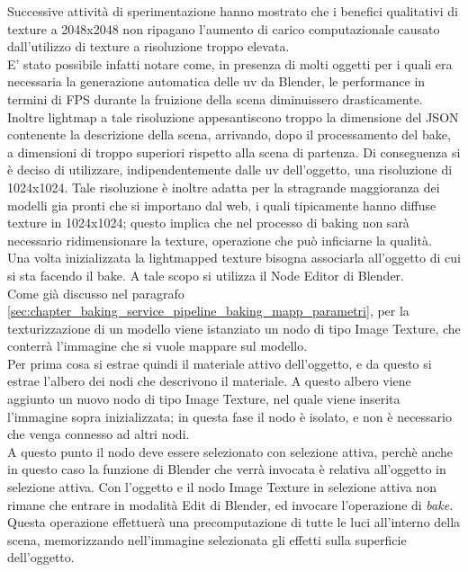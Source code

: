 Successive attività di sperimentazione hanno mostrato che i benefici qualitativi di texture a 2048x2048  non ripagano l’aumento di carico computazionale causato dall’utilizzo di texture a risoluzione troppo elevata.
\\ 
E’ stato possibile infatti notare come, in presenza di molti oggetti per i quali era necessaria la generazione automatica delle uv da Blender, le performance in termini di FPS durante la fruizione della scena diminuissero drasticamente. 
\\
Inoltre lightmap a tale risoluzione appesantiscono troppo la dimensione del JSON contenente la descrizione della scena, arrivando, dopo il processamento del bake, a dimensioni di troppo superiori rispetto alla scena di partenza. Di conseguenza si è deciso di utilizzare, indipendentemente dalle uv dell’oggetto, una risoluzione di 1024x1024. Tale risoluzione è inoltre adatta per la stragrande maggioranza dei modelli gia pronti che si importano dal web, i quali tipicamente hanno diffuse texture in 1024x1024; questo implica che nel processo di baking non sarà necessario ridimensionare la texture, operazione che può inficiarne la qualità. 
\\
Una volta inizializzata la lightmapped texture bisogna associarla all’oggetto di cui si sta facendo il bake.
A tale scopo si utilizza il Node Editor di Blender. 
\\
Come già discusso nel paragrafo \ref{sec:chapter_baking_service_pipeline_baking_mapp_parametri}, per la texturizzazione di un modello viene istanziato un nodo di tipo Image Texture, che conterrà l’immagine che si vuole mappare sul modello.
\\ 
Per prima cosa si estrae quindi il materiale attivo dell’oggetto, e da questo si estrae l’albero dei nodi che descrivono il materiale. A questo albero viene aggiunto un nuovo nodo di tipo Image Texture, nel quale viene inserita l’immagine sopra inizializzata; in questa fase il nodo è isolato, e non è necessario che venga connesso ad altri nodi. 
\\
A questo punto il nodo deve essere selezionato con selezione attiva, perchè anche in questo caso la funzione di Blender che verrà invocata è relativa all’oggetto in selezione attiva.
Con l’oggetto e il nodo Image Texture in selezione attiva non rimane che entrare in modalità Edit di Blender, ed invocare l’operazione di \emph{bake}. 
\\
Questa operazione effettuerà una precomputazione di tutte le luci all’interno della scena, memorizzando nell’immagine selezionata gli effetti sulla superficie dell’oggetto. 
